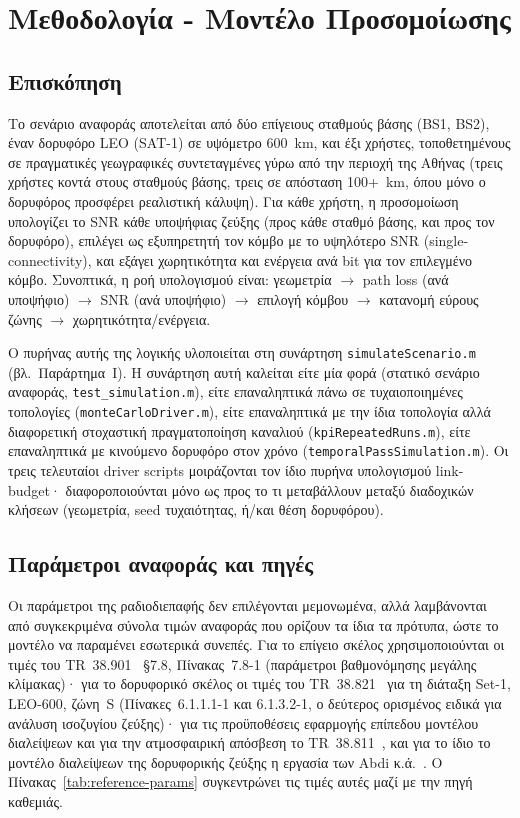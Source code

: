 \chapter{Μεθοδολογία - Μοντέλο Προσομοίωσης}
\label{ch:methodology}

\section{Επισκόπηση}
\label{sec:meth-overview}

Το σενάριο αναφοράς αποτελείται από δύο επίγειους σταθμούς βάσης (BS1,
BS2), έναν δορυφόρο LEO (SAT-1) σε υψόμετρο $600$~km, και έξι χρήστες,
τοποθετημένους σε πραγματικές γεωγραφικές συντεταγμένες γύρω από την
περιοχή της Αθήνας (τρεις χρήστες κοντά στους σταθμούς βάσης, τρεις σε
απόσταση 100+~km, όπου μόνο ο δορυφόρος προσφέρει ρεαλιστική κάλυψη). Για
κάθε χρήστη, η προσομοίωση υπολογίζει το SNR κάθε υποψήφιας ζεύξης (προς
κάθε σταθμό βάσης, και προς τον δορυφόρο), επιλέγει ως εξυπηρετητή τον
κόμβο με το υψηλότερο SNR (single-connectivity), και εξάγει χωρητικότητα
και ενέργεια ανά bit για τον επιλεγμένο κόμβο. Συνοπτικά, η ροή υπολογισμού είναι:
γεωμετρία $\rightarrow$ path loss (ανά υποψήφιο) $\rightarrow$ SNR (ανά
υποψήφιο) $\rightarrow$ επιλογή κόμβου $\rightarrow$ κατανομή εύρους
ζώνης $\rightarrow$ χωρητικότητα/ενέργεια.

Ο πυρήνας αυτής της λογικής υλοποιείται στη συνάρτηση \texttt{simulateScenario.m}
(βλ.~Παράρτημα~Ι). Η συνάρτηση αυτή καλείται είτε μία φορά (στατικό
σενάριο αναφοράς, \texttt{test\_simulation.m}), είτε επαναληπτικά πάνω σε
τυχαιοποιημένες τοπολογίες (\texttt{monteCarloDriver.m}), είτε
επαναληπτικά με την ίδια τοπολογία αλλά διαφορετική στοχαστική
πραγματοποίηση καναλιού (\texttt{kpiRepeatedRuns.m}), είτε επαναληπτικά
με κινούμενο δορυφόρο στον χρόνο (\texttt{temporalPassSimulation.m}). Οι
τρεις τελευταίοι driver scripts μοιράζονται τον ίδιο πυρήνα υπολογισμού
link-budget· διαφοροποιούνται μόνο ως προς το τι μεταβάλλουν μεταξύ
διαδοχικών κλήσεων (γεωμετρία, seed τυχαιότητας, ή/και θέση δορυφόρου).

\section{Παράμετροι αναφοράς και πηγές}
\label{sec:meth-reference-params}

Οι παράμετροι της ραδιοδιεπαφής δεν επιλέγονται μεμονωμένα, αλλά
λαμβάνονται από συγκεκριμένα σύνολα τιμών αναφοράς που ορίζουν τα ίδια τα
πρότυπα, ώστε το μοντέλο να παραμένει εσωτερικά συνεπές. Για το επίγειο
σκέλος χρησιμοποιούνται οι τιμές του TR~38.901~\cite{tr38901} §7.8,
Πίνακας~7.8-1 (παράμετροι βαθμονόμησης μεγάλης κλίμακας)· για το
δορυφορικό σκέλος οι τιμές του TR~38.821~\cite{tr38821} για τη διάταξη
Set-1, LEO-600, ζώνη~S (Πίνακες~6.1.1.1-1 και 6.1.3.2-1, ο δεύτερος
ορισμένος ειδικά για ανάλυση ισοζυγίου ζεύξης)· για τις προϋποθέσεις
εφαρμογής επίπεδου μοντέλου διαλείψεων και για την ατμοσφαιρική απόσβεση
το TR~38.811~\cite{tr38811}, και για το ίδιο το μοντέλο διαλείψεων της
δορυφορικής ζεύξης η εργασία των Abdi κ.ά.~\cite{abdi2003lms}. Ο
Πίνακας~\ref{tab:reference-params} συγκεντρώνει τις τιμές αυτές μαζί με
την πηγή καθεμιάς.

